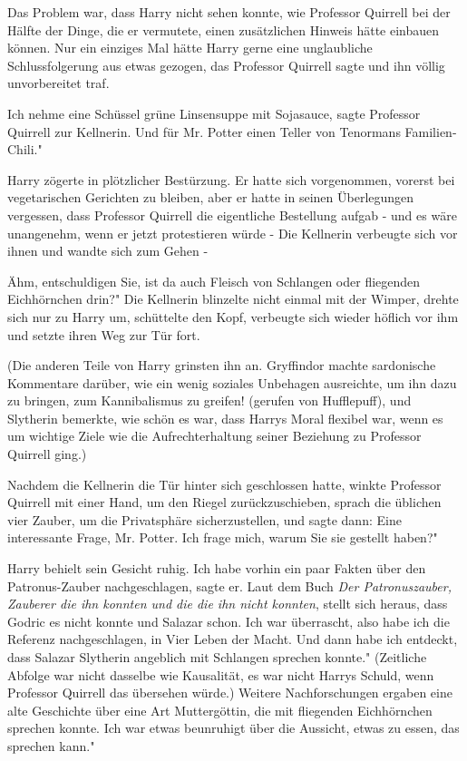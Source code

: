 Das Problem war, dass Harry nicht sehen konnte, wie Professor Quirrell bei der
Hälfte der Dinge, die er vermutete, einen zusätzlichen Hinweis hätte einbauen
können. Nur ein einziges Mal hätte Harry gerne eine unglaubliche
Schlussfolgerung aus etwas gezogen, das Professor Quirrell sagte und ihn völlig
unvorbereitet traf.

\glqq Ich nehme eine Schüssel grüne Linsensuppe mit Sojasauce\grqq{}, sagte
Professor Quirrell zur Kellnerin. \glqq Und für Mr. Potter einen Teller von
Tenormans Familien-Chili."

Harry zögerte in plötzlicher Bestürzung. Er hatte sich vorgenommen, vorerst bei
vegetarischen Gerichten zu bleiben, aber er hatte in seinen Überlegungen
vergessen, dass Professor Quirrell die eigentliche Bestellung aufgab - und es
wäre unangenehm, wenn er jetzt protestieren würde - Die Kellnerin verbeugte sich
vor ihnen und wandte sich zum Gehen -

\glqq Ähm, entschuldigen Sie, ist da auch Fleisch von Schlangen oder fliegenden
Eichhörnchen drin?" Die Kellnerin blinzelte nicht einmal mit der Wimper, drehte
sich nur zu Harry um, schüttelte den Kopf, verbeugte sich wieder höflich vor ihm
und setzte ihren Weg zur Tür fort.

(Die anderen Teile von Harry grinsten ihn an. Gryffindor machte sardonische
Kommentare darüber, wie ein wenig soziales Unbehagen ausreichte, um ihn dazu zu
bringen, zum Kannibalismus zu greifen! (gerufen von Hufflepuff), und Slytherin
bemerkte, wie schön es war, dass Harrys Moral flexibel war, wenn es um wichtige
Ziele wie die Aufrechterhaltung seiner Beziehung zu Professor Quirrell ging.)

Nachdem die Kellnerin die Tür hinter sich geschlossen hatte, winkte Professor
Quirrell mit einer Hand, um den Riegel zurückzuschieben, sprach die üblichen
vier Zauber, um die Privatsphäre sicherzustellen, und sagte dann: \glqq Eine
interessante Frage, Mr. Potter. Ich frage mich, warum Sie sie gestellt haben?"

Harry behielt sein Gesicht ruhig. \glqq Ich habe vorhin ein paar Fakten über den
Patronus-Zauber nachgeschlagen\grqq{}, sagte er. \glqq Laut dem Buch \emph{Der
Patronuszauber, Zauberer die ihn konnten und die die ihn nicht konnten}, stellt
sich heraus, dass Godric es nicht konnte und Salazar schon. Ich war überrascht,
also habe ich die Referenz nachgeschlagen, in Vier Leben der Macht. Und dann
habe ich entdeckt, dass Salazar Slytherin angeblich mit Schlangen sprechen
konnte." (Zeitliche Abfolge war nicht dasselbe wie Kausalität, es war nicht
Harrys Schuld, wenn Professor Quirrell das übersehen würde.) \glqq Weitere
Nachforschungen ergaben eine alte Geschichte über eine Art Muttergöttin, die mit
fliegenden Eichhörnchen sprechen konnte. Ich war etwas beunruhigt über die
Aussicht, etwas zu essen, das sprechen kann."

